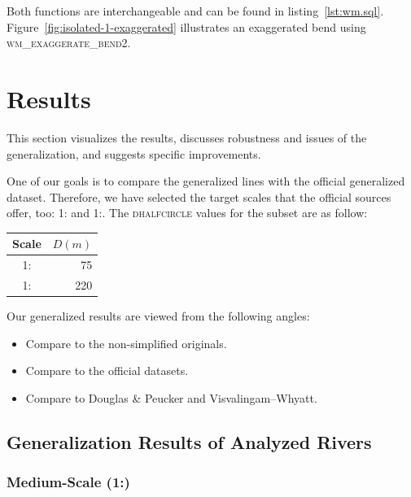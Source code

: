 \documentclass[a4paper]{article}
\newcommand{\DP}{Douglas \& Peucker}
\newcommand{\VW}{Visvalingam--Whyatt}
\begin{document}
Both functions are interchangeable and can be found in listing~\ref{lst:wm.sql}.
Figure~\ref{fig:isolated-1-exaggerated} illustrates an exaggerated bend using
\textsc{wm\_exaggerate\_bend2}.

\section{Results}
\label{sec:results}

This section visualizes the results, discusses robustness and issues of the
generalization, and suggests specific improvements.

One of our goals is to compare the generalized lines with the official
generalized dataset\cite{nzt}. Therefore, we have selected the target scales
that the official sources offer, too: 1: and
1:. The \textsc{dhalfcircle} values for the subset are as
follow:

\begin{table}[ht]
    \centering
    \begin{tabular}{ c  D{.}{.}{1} }
        Scale               &   \\ :  &  75                         \\
        1: & 220                         \\
    \end{tabular}
\end{table}

Our generalized results are viewed from the following angles:
\begin{itemize}
    \item Compare to the non-simplified originals.
    \item Compare to the official datasets.
    \item Compare to {\DP} and {\VW}.
\end{itemize}

\subsection{Generalization Results of Analyzed Rivers}
\label{sec:generalization-results-of-analyzed-rivers}

\subsubsection{Medium-Scale (1:)}
\label{sec:analyzed-medium-scale}
\end{document}
